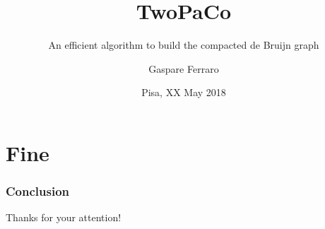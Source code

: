 \documentclass[11pt,svgnames,smaller]{beamer}
\author{Gaspare Ferraro}
\institute[University of Pisa]{University of Pisa\\Department of Computer Science}
\title{TwoPaCo}
\subtitle{An efficient algorithm to build the compacted de Bruijn graph}
\date{Pisa, XX May 2018}
\begin{document}
	

	\begin{frame} 
	\titlepage
	\end{frame}
		
	
	
	
	
	\section{Fine}
	\begin{frame}
		\frametitle{Conclusion}
		\centering
		\Large
		Thanks for your attention!
 	\end{frame}
 
 
 
\end{document}

